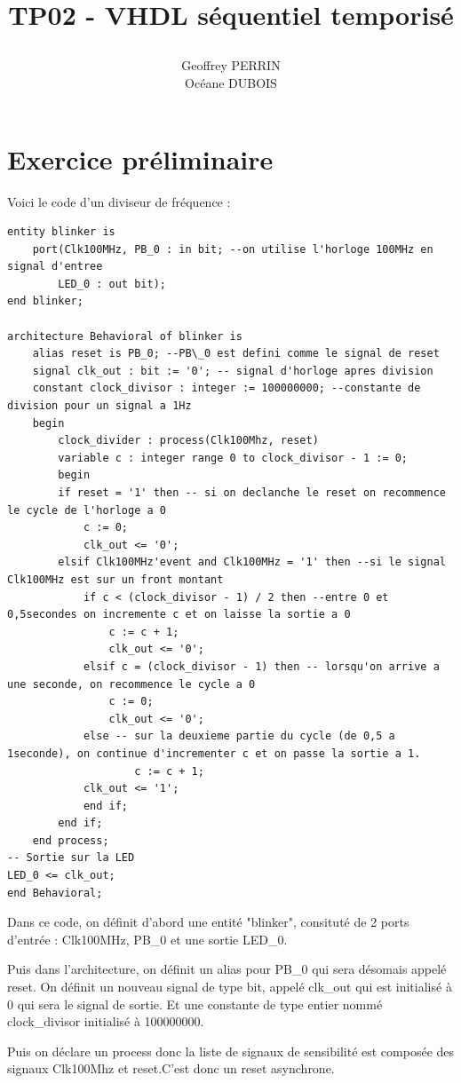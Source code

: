 \documentclass[11pt]{report}
\title{\textbf{TP02 - VHDL séquentiel temporisé}
\author{Geoffrey PERRIN \\ Océane DUBOIS\\}
\date{}}
\begin{document}
\maketitle

\newpage

\section{Exercice préliminaire}

Voici le code d'un diviseur de fréquence :
\begin{lstlisting}
entity blinker is
	port(Clk100MHz, PB_0 : in bit; --on utilise l'horloge 100MHz en signal d'entree
		LED_0 : out bit);
end blinker;

architecture Behavioral of blinker is
	alias reset is PB_0; --PB\_0 est defini comme le signal de reset
	signal clk_out : bit := '0'; -- signal d'horloge apres division
	constant clock_divisor : integer := 100000000; --constante de division pour un signal a 1Hz
	begin
		clock_divider : process(Clk100Mhz, reset)
		variable c : integer range 0 to clock_divisor - 1 := 0;
		begin
		if reset = '1' then -- si on declanche le reset on recommence le cycle de l'horloge a 0
			c := 0;
			clk_out <= '0';
		elsif Clk100MHz'event and Clk100MHz = '1' then --si le signal Clk100MHz est sur un front montant
			if c < (clock_divisor - 1) / 2 then --entre 0 et 0,5secondes on incremente c et on laisse la sortie a 0
				c := c + 1;
				clk_out <= '0';
			elsif c = (clock_divisor - 1) then -- lorsqu'on arrive a une seconde, on recommence le cycle a 0
				c := 0;
				clk_out <= '0';
			else -- sur la deuxieme partie du cycle (de 0,5 a 1seconde), on continue d'incrementer c et on passe la sortie a 1.
					c := c + 1;
			clk_out <= '1';
			end if;
		end if;
	end process;
-- Sortie sur la LED
LED_0 <= clk_out;
end Behavioral;
\end{lstlisting}

Dans ce code, on définit d'abord une entité "blinker", consituté de 2 ports d'entrée : Clk100MHz, PB\_0 et une sortie LED\_0.

Puis dans l'architecture, on définit un alias pour PB\_0 qui sera désomais appelé reset. On définit un nouveau signal de type bit, appelé clk\_out qui est initialisé à 0 qui sera le signal de sortie.  Et une constante de type entier nommé clock\_divisor initialisé à 100000000.

Puis on déclare un process donc la liste de signaux de sensibilité est composée des signaux Clk100Mhz et reset.C'est donc un reset asynchrone.
\end{document}
